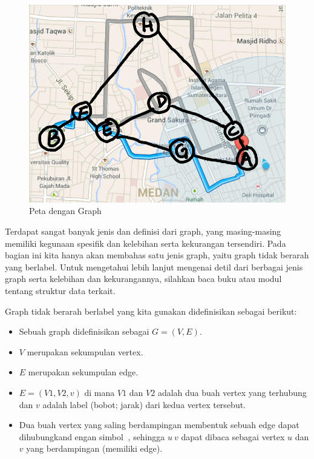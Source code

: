 \begin{figure}
    \includegraphics[width=\textwidth,keepaspectratio]{fig/DirectedGraphMap.png}%
	\caption{Peta dengan Graph}%
	\label{fig:map-graph}%
\end{figure}

Terdapat sangat banyak jenis dan definisi dari graph, yang masing-masing memiliki kegunaan spesifik dan kelebihan serta kekurangan tersendiri. Pada bagian ini kita hanya akan membahas satu jenis graph, yaitu graph tidak berarah yang berlabel. Untuk mengetahui lebih lanjut mengenai detil dari berbagai jenis graph serta kelebihan dan kekurangannya, silahkan baca buku atau modul tentang struktur data terkait.

Graph tidak berarah berlabel yang kita gunakan didefinisikan sebagai berikut:

\begin{itemize}
    \item Sebuah graph didefinisikan sebagai $G = (V, E)$.
    \item $V$ merupakan sekumpulan vertex.
    \item $E$ merupakan sekumpulan edge.
    \item $E = (V1, V2, v)$ di mana $V1$ dan $V2$ adalah dua buah vertex yang terhubung dan $v$ adalah label (bobot; jarak) dari kedua vertex tersebut.
    \item Dua buah vertex yang saling berdampingan membentuk sebuah edge dapat dihubungkand engan simbol $~$, sehingga $u ~ v$ dapat dibaca sebagai vertex $u$ dan $v$ yang berdampingan (memiliki edge).
\end{itemize}

